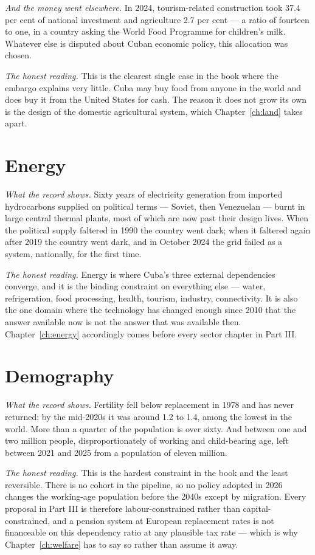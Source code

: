 \emph{And the money went elsewhere.} In 2024, tourism-related construction took
37.4 per cent of national investment and agriculture 2.7 per cent --- a ratio of
fourteen to one, in a country asking the World Food Programme for children's
milk. Whatever else is disputed about Cuban economic policy, this allocation was
chosen.

\emph{The honest reading.} This is the clearest single case in the book where
the embargo explains very little. Cuba may buy food from anyone in the world and
does buy it from the United States for cash. The reason it does not grow its own
is the design of the domestic agricultural system, which
Chapter~\ref{ch:land} takes apart.

\section{Energy}

\emph{What the record shows.} Sixty years of electricity generation from
imported hydrocarbons supplied on political terms --- Soviet, then Venezuelan
--- burnt in large central thermal plants, most of which are now past their
design lives. When the political supply faltered in 1990 the country went dark;
when it faltered again after 2019 the country went dark, and in October 2024 the
grid failed as a system, nationally, for the first time.

\emph{The honest reading.} Energy is where Cuba's three external dependencies
converge, and it is the binding constraint on everything else --- water,
refrigeration, food processing, health, tourism, industry, connectivity. It is
also the one domain where the technology has changed enough since 2010 that the
answer available now is not the answer that was available then.
Chapter~\ref{ch:energy} accordingly comes before every sector chapter in
Part III.

\section{Demography}

\emph{What the record shows.} Fertility fell below replacement in 1978 and has
never returned; by the mid-2020s it was around 1.2 to 1.4, among the lowest in
the world.\unv{} More than a quarter of the population is over sixty. And
between one and two million people, disproportionately of working and
child-bearing age, left between 2021 and 2025 from a population of eleven
million.

\emph{The honest reading.} This is the hardest constraint in the book and the
least reversible. There is no cohort in the pipeline, so no policy adopted in
2026 changes the working-age population before the 2040s except by migration.
Every proposal in Part III is therefore labour-constrained rather than
capital-constrained, and a pension system at European replacement rates is not
financeable on this dependency ratio at any plausible tax rate --- which is why
Chapter~\ref{ch:welfare} has to say so rather than assume it away.

